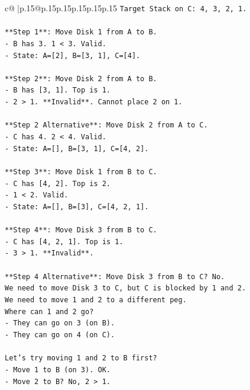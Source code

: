 \documentclass{article}
\begin{document}
{\begin{supertabular}{c@{$\;$}|p{.15\linewidth}@{}p{.15\linewidth}p{.15\linewidth}p{.15\linewidth}p{.15\linewidth}p{.15\linewidth}}
{{{\texttt{Target Stack on C: 4, 3, 2, 1.} \\
\\ 
\texttt{**Step 1**: Move Disk 1 from A to B.} \\
\texttt{{-} B has 3. 1 < 3. Valid.} \\
\texttt{{-} State: A={[}2{]}, B={[}3, 1{]}, C={[}4{]}.} \\
\\ 
\texttt{**Step 2**: Move Disk 2 from A to B.} \\
\texttt{{-} B has {[}3, 1{]}. Top is 1.} \\
\texttt{{-} 2 > 1. **Invalid**. Cannot place 2 on 1.} \\
\\ 
\texttt{**Step 2 Alternative**: Move Disk 2 from A to C.} \\
\texttt{{-} C has 4. 2 < 4. Valid.} \\
\texttt{{-} State: A={[}{]}, B={[}3, 1{]}, C={[}4, 2{]}.} \\
\\ 
\texttt{**Step 3**: Move Disk 1 from B to C.} \\
\texttt{{-} C has {[}4, 2{]}. Top is 2.} \\
\texttt{{-} 1 < 2. Valid.} \\
\texttt{{-} State: A={[}{]}, B={[}3{]}, C={[}4, 2, 1{]}.} \\
\\ 
\texttt{**Step 4**: Move Disk 3 from B to C.} \\
\texttt{{-} C has {[}4, 2, 1{]}. Top is 1.} \\
\texttt{{-} 3 > 1. **Invalid**.} \\
\\ 
\texttt{**Step 4 Alternative**: Move Disk 3 from B to C? No.} \\
\texttt{We need to move Disk 3 to C, but C is blocked by 1 and 2.} \\
\texttt{We need to move 1 and 2 to a different peg.} \\
\texttt{Where can 1 and 2 go?} \\
\texttt{{-} They can go on 3 (on B).} \\
\texttt{{-} They can go on 4 (on C).} \\
\\ 
\texttt{Let's try moving 1 and 2 to B first?} \\
\texttt{{-} Move 1 to B (on 3). OK.} \\
\texttt{{-} Move 2 to B? No, 2 > 1.} \\
}}}
\end{supertabular}}
\end{document}
